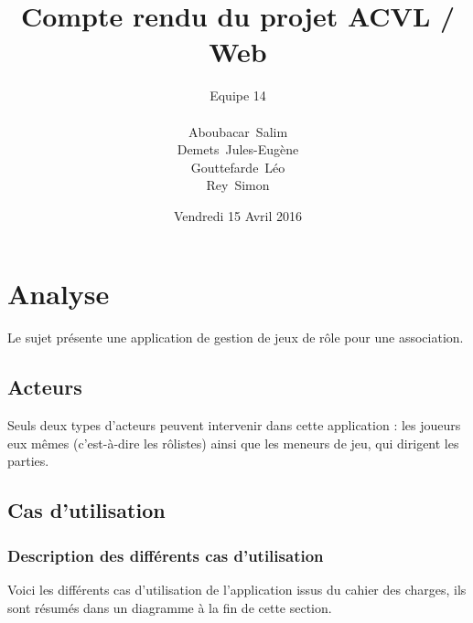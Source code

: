 \documentclass[a4paper, 11pt, titlepage]{article}
\title {{ {\huge Compte rendu du projet ACVL / Web }} }
\author{\Large Equipe 14 \\
\\
    {\sc Aboubacar}~Salim\\
    {\sc Demets}~Jules-Eugène\\
    {\sc Gouttefarde}~Léo\\
    {\sc Rey}~Simon
}
\date{Vendredi 15 Avril 2016}
\begin{document}
\pagestyle{fancy}
\maketitle

\setcounter{tocdepth}{2}

\tableofcontents
\newpage




\section {Analyse}

Le sujet présente une application de gestion de jeux de rôle pour une association.

\subsection{Acteurs}

Seuls deux types d'acteurs peuvent intervenir dans cette application : les joueurs eux mêmes (c'est-à-dire les rôlistes) ainsi que les meneurs de jeu, qui dirigent les parties.

\subsection{Cas d'utilisation}

\subsubsection{Description des différents cas d'utilisation}

Voici les différents cas d'utilisation de l'application issus du cahier des charges, ils sont résumés dans un diagramme à la fin de cette section.
\end{document}
